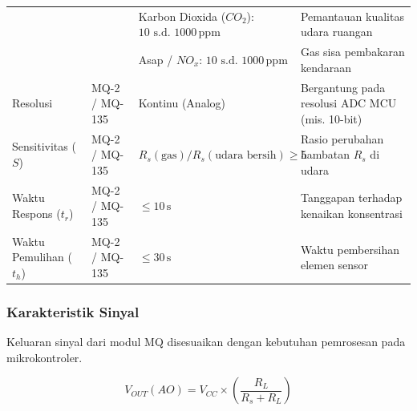 \begin{table}[H]
\begin{tabularx}{\textwidth}{@{} p{2.4cm} l X X @{}}
		                        &                                               & Karbon Dioxida ($CO_2$): $10\text{ s.d. }1000\,\text{ppm}$ & Pemantauan kualitas udara ruangan              \\
		                        &                                               & Asap / $NO_x$: $10\text{ s.d. }1000\,\text{ppm}$           & Gas sisa pembakaran kendaraan                  \\
		\midrule
		Resolusi                & MQ-2 / MQ-135                                 & Kontinu (Analog)                                       & Bergantung pada resolusi ADC MCU (mis. 10-bit) \\
		Sensitivitas ($S$)      & MQ-2 / MQ-135                                 & $R_s(\text{gas}) / R_s(\text{udara bersih}) \ge 5$     & Rasio perubahan hambatan $R_s$ di udara        \\
		Waktu Respons ($t_r$)   & MQ-2 / MQ-135                                 & $\le 10\,\text{s}$                                     & Tanggapan terhadap kenaikan konsentrasi        \\
		Waktu Pemulihan ($t_h$) & MQ-2 / MQ-135                                 & $\le 30\,\text{s}$                                     & Waktu pembersihan elemen sensor                \\
		\bottomrule
	\end{tabularx}
\end{table}

\subsubsection{Karakteristik Sinyal}
Keluaran sinyal dari modul MQ disesuaikan dengan kebutuhan pemrosesan pada mikrokontroler.

\begin{equation}
	V_{OUT}(AO) = V_{CC} \times \left( \frac{R_L}{R_s + R_L} \right)
	\label{eq:mq_packet}
\end{equation}

